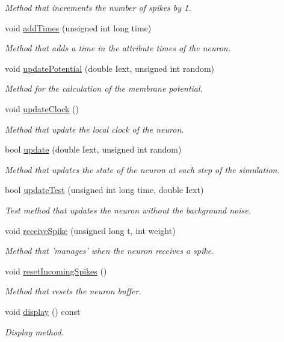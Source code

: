 \begin{DoxyCompactItemize}
\begin{DoxyCompactList}\small\item\em Method that increments the number of spikes by 1. \end{DoxyCompactList}\item 
void \hyperlink{classNeuron_a0bb50617cd913cce811b2e8bdd16dcc8}{add\-Times} (unsigned int long time)
\begin{DoxyCompactList}\small\item\em Method that adds a time in the attribute times of the neuron. \end{DoxyCompactList}\item 
void \hyperlink{classNeuron_aca3cec2cc4cad6cd486bc1ae45ad719b}{update\-Potential} (double Iext, unsigned int random)
\begin{DoxyCompactList}\small\item\em Method for the calculation of the membrane potential. \end{DoxyCompactList}\item 
void \hyperlink{classNeuron_a13724e0506186d8c326ea204da95a778}{update\-Clock} ()
\begin{DoxyCompactList}\small\item\em Method that update the local clock of the neuron. \end{DoxyCompactList}\item 
bool \hyperlink{classNeuron_a371e891ce652d43aaaf2eb99cc93ffb3}{update} (double Iext, unsigned int random)
\begin{DoxyCompactList}\small\item\em Method that updates the state of the neuron at each step of the simulation. \end{DoxyCompactList}\item 
bool \hyperlink{classNeuron_a93ae22368f479a354e88ee9ec3a7882b}{update\-Test} (unsigned int long time, double Iext)
\begin{DoxyCompactList}\small\item\em Test method that updates the neuron without the background noise. \end{DoxyCompactList}\item 
void \hyperlink{classNeuron_af47c31bc21db4e4704acc6fe86a847ee}{receive\-Spike} (unsigned long t, int weight)
\begin{DoxyCompactList}\small\item\em Method that 'manages' when the neuron receives a spike. \end{DoxyCompactList}\item 
void \hyperlink{classNeuron_adc209667f6483b0a99ee647458a48d7e}{reset\-Incoming\-Spikes} ()
\begin{DoxyCompactList}\small\item\em Method that resets the neuron buffer. \end{DoxyCompactList}\item 
void \hyperlink{classNeuron_aaba03abe00dad51c0275774eac621d4b}{display} () const 
\begin{DoxyCompactList}\small\item\em Display method. \end{DoxyCompactList}\end{DoxyCompactItemize}


